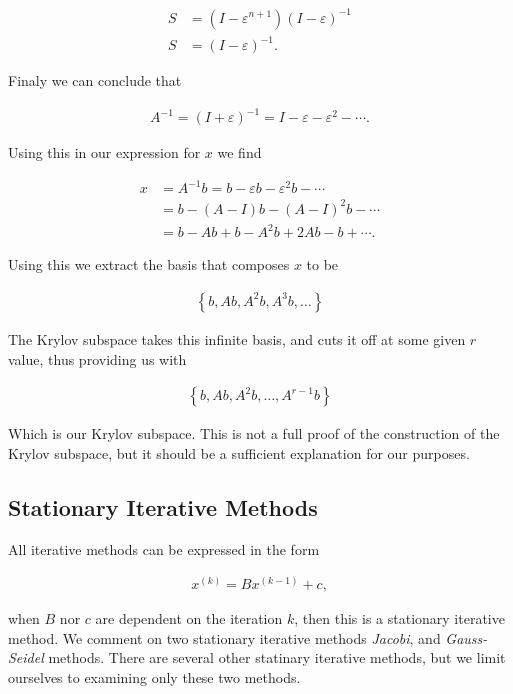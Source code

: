 \documentclass[../fem.tex]{subfiles}
\begin{document}
\begin{align*}
  S&=\left(I-\varepsilon^{n+1}\right)\left(I-\varepsilon\right)^{-1}\\
  S&=\left(I-\varepsilon\right)^{-1}.
\end{align*}

Finaly we can conclude that

\begin{align*}
  A^{-1}=(I+\varepsilon)^{-1}=I-\varepsilon-\varepsilon^2-\cdots.
\end{align*}

Using this in our expression for $x$ we find

\begin{align*}
  x&=A^{-1}b=b-\varepsilon b-\varepsilon^2 b - \cdots\\
   &=b-(A-I)b-(A-I)^2b-\cdots\\
   &=b-Ab+b-A^2b+2Ab-b+\cdots.
\end{align*}

Using this we extract the basis that composes $x$ to be

\begin{align*}
  \left\{b, Ab, A^2b, A^3b, \ldots\right\}
\end{align*}

The Krylov subspace takes this infinite basis, and cuts it off at some given
$r$ value, thus providing us with

\begin{align*}
  \left\{b,Ab,A^2b,\ldots,A^{r-1}b\right\}
\end{align*}

Which is our Krylov subspace. This is not a full proof of the construction of
the Krylov subspace, but it should be a sufficient explanation for our purposes.

\subsection{Stationary Iterative Methods}%
\label{sub:stationary_iterative_methods}

All iterative methods can be expressed in the form

\begin{align*}
  x^{(k)}=Bx^{(k-1)}+c,
\end{align*}

when $B$ nor $c$ are dependent on the iteration $k$, then this is a stationary
iterative method. We comment on two stationary iterative methods
\textit{Jacobi}, and \textit{Gauss-Seidel} methods. There are several other
statinary iterative methods, but we limit ourselves to examining only these two
methods.
\end{document}
